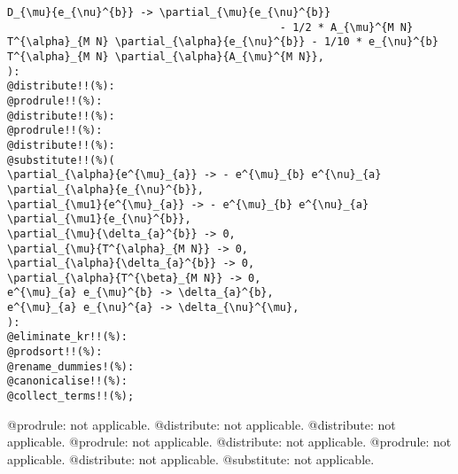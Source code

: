 \documentclass[11pt]{article}
\begin{document}
{\begin{verbatim}
D_{\mu}{e_{\nu}^{b}} -> \partial_{\mu}{e_{\nu}^{b}} 
                                           - 1/2 * A_{\mu}^{M N} T^{\alpha}_{M N} \partial_{\alpha}{e_{\nu}^{b}} - 1/10 * e_{\nu}^{b} T^{\alpha}_{M N} \partial_{\alpha}{A_{\mu}^{M N}},
):
@distribute!!(%):
@prodrule!!(%):
@distribute!!(%):
@prodrule!!(%):
@distribute!!(%):
@substitute!!(%)(
\partial_{\alpha}{e^{\mu}_{a}} -> - e^{\mu}_{b} e^{\nu}_{a} \partial_{\alpha}{e_{\nu}^{b}},
\partial_{\mu1}{e^{\mu}_{a}} -> - e^{\mu}_{b} e^{\nu}_{a} \partial_{\mu1}{e_{\nu}^{b}},
\partial_{\mu}{\delta_{a}^{b}} -> 0,
\partial_{\mu}{T^{\alpha}_{M N}} -> 0,
\partial_{\alpha}{\delta_{a}^{b}} -> 0,
\partial_{\alpha}{T^{\beta}_{M N}} -> 0,
e^{\mu}_{a} e_{\mu}^{b} -> \delta_{a}^{b},
e^{\mu}_{a} e_{\nu}^{a} -> \delta_{\nu}^{\mu},
):
@eliminate_kr!!(%):
@prodsort!!(%):
@rename_dummies!(%):
@canonicalise!!(%):
@collect_terms!!(%);
\end{verbatim}}
@prodrule: not applicable.
@distribute: not applicable.
@distribute: not applicable.
@prodrule: not applicable.
@distribute: not applicable.
@prodrule: not applicable.
@distribute: not applicable.
@substitute: not applicable.
\end{document}
